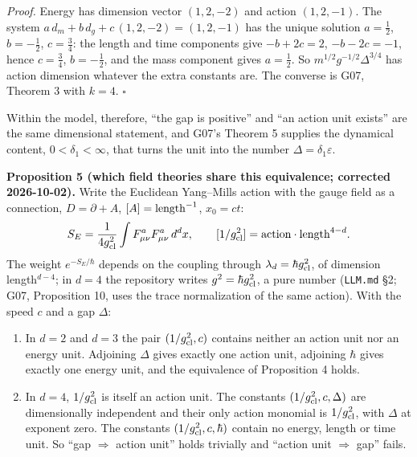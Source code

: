 \documentclass[11pt,a4paper]{article}
\newcommand{\tightlist}{\setlength{\itemsep}{0pt}\setlength{\parskip}{0pt}}
\begin{document}
\emph{Proof.} Energy has dimension vector \((1,2,-2)\) and action
\((1,2,-1)\). The system \(a\,d_m+b\,d_g+c\,(1,2,-2)=(1,2,-1)\) has the
unique solution \(a=\tfrac12\), \(b=-\tfrac12\), \(c=\tfrac34\): the
length and time components give \(-b+2c=2\), \(-b-2c=-1\), hence
\(c=\tfrac34\), \(b=-\tfrac12\), and the mass component gives
\(a=\tfrac12\). So \(m^{1/2}g^{-1/2}\Delta^{3/4}\) has action dimension
whatever the extra constants are. The converse is G07, Theorem 3 with
\(k=4\). \(\square\)

Within the model, therefore, ``the gap is positive'' and ``an action
unit exists'' are the same dimensional statement, and G07's Theorem 5
supplies the dynamical content, \(0<\delta_1<\infty\), that turns the
unit into the number \(\Delta=\delta_1\varepsilon\).

\textbf{Proposition 5 (which field theories share this equivalence;
corrected 2026-10-02).} Write the Euclidean Yang--Mills action with the
gauge field as a connection, \(D=\partial+A\),
\([A]={\rm length}^{-1}\), \(x_0=ct\):
\[S_E=\frac1{4g_{\rm cl}^2}\int F^a_{\mu\nu}F^a_{\mu\nu}\,d^dx,\qquad
[1/g_{\rm cl}^2]={\rm action}\cdot{\rm length}^{4-d}.\] The weight
\(e^{-S_E/\hbar}\) depends on the coupling through
\(\lambda_d=\hbar g_{\rm cl}^2\), of dimension length\(^{d-4}\); in
\(d=4\) the repository writes \(g^2=\hbar g_{\rm cl}^2\), a pure number
(\texttt{LLM.md} §2; G07, Proposition 10, uses the trace normalization
of the same action). With the speed \(c\) and a gap \(\Delta\):

\begin{enumerate}
\def\labelenumi{\arabic{enumi}.}
\tightlist
\item
  In \(d=2\) and \(d=3\) the pair \((1/g_{\rm cl}^2,c)\) contains
  neither an action unit nor an energy unit. Adjoining \(\Delta\) gives
  exactly one action unit, adjoining \(\hbar\) gives exactly one energy
  unit, and the equivalence of Proposition 4 holds.
\item
  In \(d=4\), \(1/g_{\rm cl}^2\) is itself an action unit. The constants
  \((1/g_{\rm cl}^2,c,\Delta)\) are dimensionally independent and their
  only action monomial is \(1/g_{\rm cl}^2\), with \(\Delta\) at
  exponent zero. The constants \((1/g_{\rm cl}^2,c,\hbar)\) contain no
  energy, length or time unit. So ``gap \(\Rightarrow\) action unit''
  holds trivially and ``action unit \(\Rightarrow\) gap'' fails.
\end{enumerate}
\end{document}
